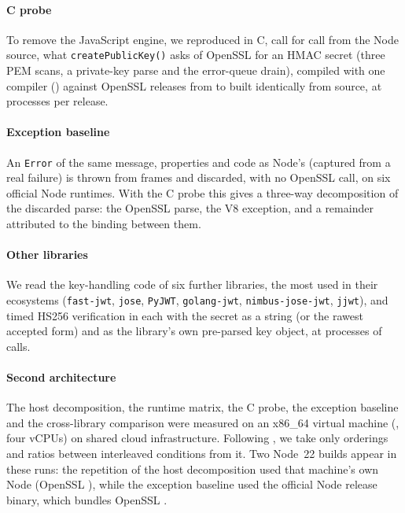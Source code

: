 \documentclass[preprint,12pt,authoryear]{elsarticle}
\begin{document}
\paragraph{C probe}\label{sec:c-method} To remove the JavaScript engine, we
reproduced in C, call for call from the Node source, what
\texttt{createPublicKey()} asks of OpenSSL for an HMAC secret (three PEM scans,
a private-key parse and the error-queue drain), compiled with one compiler
(\CProbeCompiler) against \CProbeVersionCount{} OpenSSL releases from
\CProbeVersionFirst{} to \CProbeVersionLast{} built identically from source,
at \CProbeInvocations{} processes per release.

\paragraph{Exception baseline}\label{sec:exc-method} An \texttt{Error} of the
same message, properties and code as Node's (captured from a real failure) is
thrown from \ExcDepth{} frames and discarded, with no OpenSSL call, on six
official Node runtimes. With the C probe this gives a three-way decomposition
of the discarded parse: the OpenSSL parse, the V8 exception, and a remainder
attributed to the binding between them.

\paragraph{Other libraries}\label{sec:xlib-method} We read the key-handling
code of six further libraries, the most used in their ecosystems
(\texttt{fast-jwt}, \texttt{jose}, \texttt{PyJWT}, \texttt{golang-jwt},
\texttt{nimbus-jose-jwt}, \texttt{jjwt}), and timed HS256 verification in each
with the secret as a string (or the rawest accepted form) and as the library's
own pre-parsed key object, at \XlibInvocations{} processes of
\XlibCallsPerInvocation{} calls.

\paragraph{Second architecture}\label{sec:arch-method} The host decomposition,
the runtime matrix, the C probe, the exception baseline and the cross-library
comparison were measured on an x86\_64 virtual machine (\ExcCpuModel, four
vCPUs) on shared cloud infrastructure. Following \citet{laaber2019cloud}, we take
only orderings and ratios between interleaved conditions from it. Two Node~22
builds appear in these runs: the repetition of the host decomposition used that
machine's own Node \XhNode{} (OpenSSL \XhOpenssl), while the exception baseline
used the official Node \RtTwentyTwoLiteral{} release binary, which bundles
OpenSSL \RtTwentyTwoOpenssl.
\end{document}
